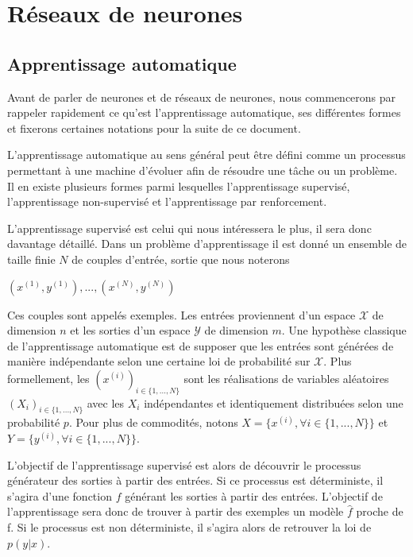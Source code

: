 \chapter{Réseaux de neurones}

\section{Apprentissage automatique}

Avant de parler de neurones et de réseaux de neurones, nous commencerons par rappeler rapidement ce qu'est l'apprentissage automatique, ses différentes formes et fixerons certaines notations pour la suite de ce document.

L'apprentissage automatique au sens général peut être défini comme un processus permettant à une machine d'évoluer afin de résoudre une tâche ou un problème. Il en existe plusieurs formes parmi lesquelles l'apprentissage supervisé, l'apprentissage non-supervisé et l'apprentissage par renforcement.

L'apprentissage supervisé est celui qui nous intéressera le plus, il sera donc davantage détaillé. Dans un problème d'apprentissage il est donné un ensemble de taille finie $N$ de couples d'entrée, sortie que nous noterons 

\centerline{$(x^{(1)},y^{(1)}),..., (x^{(N)}, y^{(N)})$}

Ces couples sont appelés exemples. Les entrées proviennent d'un espace $\mathcal{X}$ de dimension $n$ et les sorties d'un espace $\mathcal{Y}$ de dimension $m$. Une hypothèse classique de l'apprentissage automatique est de supposer que les entrées sont générées de manière indépendante selon une certaine loi de probabilité sur $\mathcal{X}$. Plus formellement, les $(x^{(i)})_{i \in \{1, ..., N\}}$ sont les réalisations de variables aléatoires $(X_i)_{i \in \{1, ..., N\}}$ avec les $X_i$ indépendantes et identiquement distribuées selon une probabilité $p$. Pour plus de commodités, notons $X = \{x^{(i)}, \forall i \in \{1, ..., N\}\}$ et $Y = \{y^{(i)}, \forall i \in \{1, ..., N\}\}$.

L'objectif de l'apprentissage supervisé est alors de découvrir le processus générateur des sorties à partir des entrées. Si ce processus est déterministe, il s'agira d'une fonction $f$ générant les sorties à partir des entrées. L'objectif de l'apprentissage sera donc de trouver à partir des exemples un modèle $\hat{f}$ proche de f. Si le processus est non déterministe, il s'agira alors de retrouver la loi de $p(y|x)$.

